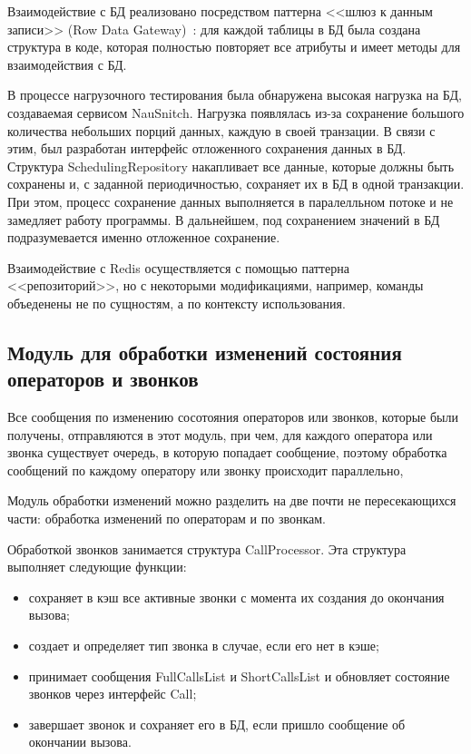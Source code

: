 Взаимодействие с БД реализовано посредством паттерна <<шлюз к данным записи>> (Row Data Gateway)~\cite{fauler2019}:
для каждой таблицы в БД %
была создана структура в коде, которая полностью повторяет все атрибуты
и имеет методы для взаимодействия с БД.

В процессе нагрузочного тестирования была обнаружена высокая нагрузка
на БД, создаваемая сервисом NauSnitch.
Нагрузка появлялась из-за сохранение большого количества
небольших порций данных, каждую в своей транзации.
В связи с этим, был разработан интерфейс отложенного сохранения данных в БД.
Структура SchedulingRepository накапливает все данные, которые должны быть сохранены и,
с заданной периодичностью, сохраняет их в БД в одной транзакции.
При этом, процесс сохранение данных выполняется в паралелльном потоке и не замедляет работу программы.
В дальнейшем, под сохранением значений в БД подразумевается именно отложенное сохранение.


Взаимодействие с Redis осуществляется с помощью паттерна <<репозиторий>>, %
но с некоторыми модификациями, например, команды объеденены не по сущностям, а по контексту использования. %

\subsection{Модуль для обработки изменений состояния операторов и звонков}

Все сообщения по изменению сосотояния операторов или звонков, которые были получены,
отправляются в этот модуль, при чем,
для каждого оператора или звонка существует очередь, в которую попадает сообщение,
поэтому обработка сообщений по каждому оператору или звонку происходит параллельно, %

Модуль обработки изменений можно разделить на две почти не пересекающихся части: обработка изменений по операторам и по звонкам.


Обработкой звонков занимается структура CallProcessor.
Эта структура выполняет следующие функции:
\begin{itemize}
    \item сохраняет в кэш все активные звонки с момента их создания до окончания вызова;
    \item создает и определяет тип звонка в случае, если его нет в кэше; %
    \item принимает сообщения FullCallsList и ShortCallsList и обновляет состояние звонков через интерфейс Call;
    \item завершает звонок и сохраняет его в БД, если пришло сообщение об окончании вызова.
\end{itemize}

